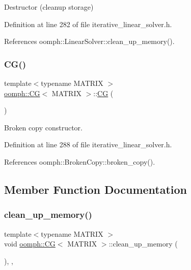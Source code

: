 Destructor (cleanup storage) 



Definition at line 282 of file iterative\+\_\+linear\+\_\+solver.\+h.



References oomph\+::\+Linear\+Solver\+::clean\+\_\+up\+\_\+memory().

\mbox{\label{classoomph_1_1CG_aad7c2ce9ee38bcd3052f05460c4b4ee6}} 
\subsubsection{\texorpdfstring{C\+G()}{CG()}\hspace{0.1cm}{\footnotesize\ttfamily [2/2]}}
{\footnotesize\ttfamily template$<$typename M\+A\+T\+R\+IX $>$ \\
\hyperlink{classoomph_1_1CG}{oomph\+::\+CG}$<$ M\+A\+T\+R\+IX $>$\+::\hyperlink{classoomph_1_1CG}{CG} (\begin{DoxyParamCaption}\item[{const \hyperlink{classoomph_1_1CG}{CG}$<$ M\+A\+T\+R\+IX $>$ \&}]{ }\end{DoxyParamCaption})\hspace{0.3cm}{\ttfamily [inline]}}



Broken copy constructor. 



Definition at line 288 of file iterative\+\_\+linear\+\_\+solver.\+h.



References oomph\+::\+Broken\+Copy\+::broken\+\_\+copy().



\subsection{Member Function Documentation}
\mbox{\label{classoomph_1_1CG_ab51014aac249e9998a002509c7a3088e}} 
\subsubsection{\texorpdfstring{clean\+\_\+up\+\_\+memory()}{clean\_up\_memory()}}
{\footnotesize\ttfamily template$<$typename M\+A\+T\+R\+IX $>$ \\
void \hyperlink{classoomph_1_1CG}{oomph\+::\+CG}$<$ M\+A\+T\+R\+IX $>$\+::clean\+\_\+up\+\_\+memory (\begin{DoxyParamCaption}{ }\end{DoxyParamCaption})\hspace{0.3cm}{\ttfamily [inline]}, {\ttfamily [private]}, {\ttfamily [virtual]}}



